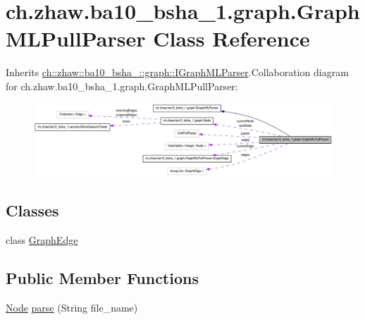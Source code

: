 \hypertarget{classch_1_1zhaw_1_1ba10__bsha__1_1_1graph_1_1GraphMLPullParser}{
\section{ch.zhaw.ba10\_\-bsha\_\-1.graph.GraphMLPullParser Class Reference}
\label{classch_1_1zhaw_1_1ba10__bsha__1_1_1graph_1_1GraphMLPullParser}
}


Inherits \hyperlink{interfacech_1_1zhaw_1_1ba10__bsha__1_1_1graph_1_1IGraphMLParser}{ch::zhaw::ba10\_\-bsha\_::graph::IGraphMLParser}.Collaboration diagram for ch.zhaw.ba10\_\-bsha\_\-1.graph.GraphMLPullParser:\nopagebreak
\begin{figure}[H]
\begin{center}
\leavevmode
\includegraphics[width=400pt]{classch_1_1zhaw_1_1ba10__bsha__1_1_1graph_1_1GraphMLPullParser__coll__graph}
\end{center}
\end{figure}
\subsection*{Classes}
\begin{DoxyCompactItemize}
\item 
class \hyperlink{classch_1_1zhaw_1_1ba10__bsha__1_1_1graph_1_1GraphMLPullParser_1_1GraphEdge}{GraphEdge}
\end{DoxyCompactItemize}
\subsection*{Public Member Functions}
\begin{DoxyCompactItemize}
\item 
\hyperlink{classch_1_1zhaw_1_1ba10__bsha__1_1_1graph_1_1Node}{Node} \hyperlink{classch_1_1zhaw_1_1ba10__bsha__1_1_1graph_1_1GraphMLPullParser_a4d51cf5d2432541f6777df36b8649d70}{parse} (String file\_\-name)
\end{DoxyCompactItemize}
